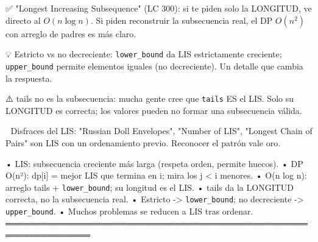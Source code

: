 \begin{dsaentrevistas}

✅ "Longest Increasing Subsequence" (LC 300): si te piden solo la
   LONGITUD, ve directo al $O(n \log n)$. Si piden reconstruir la
   subsecuencia real, el DP $O(n^2)$ con arreglo de padres es más claro.

💡 Estricto vs no decreciente: \verb|lower_bound| da LIS estrictamente
   creciente; \verb|upper_bound| permite elementos iguales (no
   decreciente). Un detalle que cambia la respuesta.

⚠️ tails no es la subsecuencia: mucha gente cree que \verb|tails| ES el
   LIS. Solo su LONGITUD es correcta; los valores pueden no formar una
   subsecuencia válida.

🔑 Disfraces del LIS: "Russian Doll Envelopes", "Number of LIS",
   "Longest Chain of Pairs" son LIS con un ordenamiento previo. Reconocer
   el patrón vale oro.

\end{dsaentrevistas}

\begin{dsaresumen}

• LIS: subsecuencia creciente más larga (respeta orden, permite huecos).
• DP O(n²): dp[i] = mejor LIS que termina en i; mira los j < i menores.
• O(n log n): arreglo tails + \verb|lower_bound|; su longitud es el LIS.
• tails da la LONGITUD correcta, no la subsecuencia real.
• Estricto -> \verb|lower_bound|; no decreciente -> \verb|upper_bound|.
• Muchos problemas se reducen a LIS tras ordenar.
════════════════════════════════════════════════════════════════

\end{dsaresumen}
